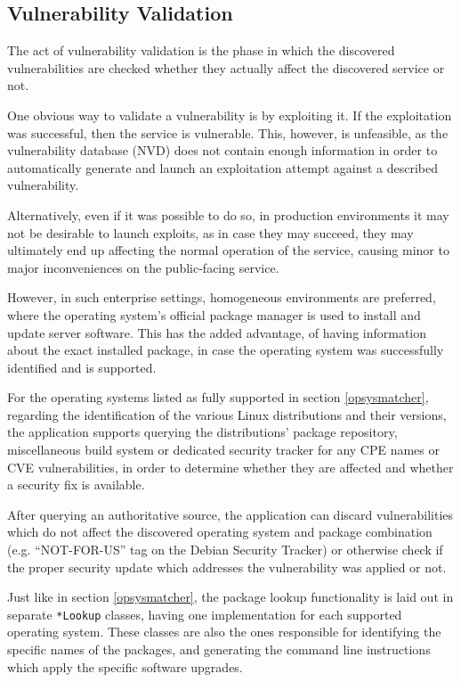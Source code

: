 \documentclass[a4paper,12pt]{article}
\begin{document}
\subsection{Vulnerability Validation} \label{vulnvalid}
 

	The act of vulnerability validation is the phase in which the discovered vulnerabilities are checked whether they actually affect the discovered service or not.
	
	One obvious way to validate a vulnerability is by exploiting it. If the exploitation was successful, then the service is vulnerable. This, however, is unfeasible, as the vulnerability database (NVD) does not contain enough information in order to automatically generate and launch an exploitation attempt against a described vulnerability.
	
	Alternatively, even if it was possible to do so, in production environments it may not be desirable to launch exploits, as in case they may succeed, they may ultimately end up affecting the normal operation of the service, causing minor to major inconveniences on the public-facing service.
	
	However, in such enterprise settings, homogeneous environments are preferred, where the operating system's official package manager is used to install and update server software. This has the added advantage, of having information about the exact installed package, in case the operating system was successfully identified and is supported.
	
	For the operating systems listed as fully supported in section \ref{opsysmatcher}, regarding the identification of the various Linux distributions and their versions, the application supports querying the distributions' package repository, miscellaneous build system or dedicated security tracker for any CPE names or CVE vulnerabilities, in order to determine whether they are affected and whether a security fix is available.
	
	After querying an authoritative source, the application can discard vulnerabilities which do not affect the discovered operating system and package combination (e.g. ``NOT-FOR-US'' tag on the Debian Security Tracker) or otherwise check if the proper security update which addresses the vulnerability was applied or not.
	
	Just like in section \ref{opsysmatcher}, the package lookup functionality is laid out in separate \texttt{*Lookup} classes, having one implementation for each supported operating system. These classes are also the ones responsible for identifying the specific names of the packages, and generating the command line instructions which apply the specific software upgrades.
	
\end{document}
